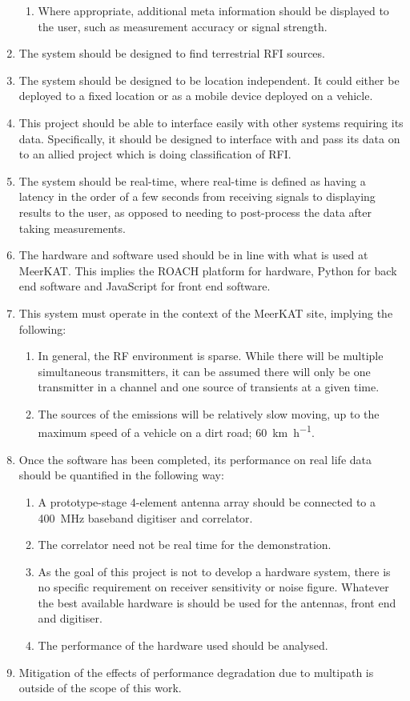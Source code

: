 \begin{enumerate}
\begin{enumerate}
      \item Where appropriate, additional meta information should be displayed to the user, such as measurement accuracy or signal strength.
    \end{enumerate}
  \item The system should be designed to find terrestrial RFI sources.
  \item The system should be designed to be location independent. It could either be deployed to a fixed location or as a mobile device deployed on a vehicle.
  \item This project should be able to interface easily with other systems requiring its data. Specifically, it should be designed to interface with and pass its data on to an allied project which is doing classification of RFI.
  \item The system should be real-time, where real-time is defined as having a latency in the order of a few seconds from receiving signals to displaying results to the user, as opposed to needing to post-process the data after taking measurements.
  \item The hardware and software used should be in line with what is used at MeerKAT. This implies the ROACH platform for hardware, Python for back end software and JavaScript for front end software.  
  \item This system must operate in the context of the MeerKAT site, implying the following:
  \begin{enumerate}
      \item In general, the RF environment is sparse. While there will be multiple simultaneous transmitters, it can be assumed there will only be one transmitter in a channel and one source of transients at a given time.
      \item The sources of the emissions will be relatively slow moving, up to the maximum speed of a vehicle on a dirt road; \SI[per-mode=symbol]{60}{\kilo\metre\per\hour}.
  \end{enumerate}

  \item Once the software has been completed, its performance on real life data should be quantified in the following way:
    \begin{enumerate}
      \item A prototype-stage 4-element antenna array should be connected to a \SI{400}{\mega\hertz} baseband digitiser and correlator.
      \item The correlator need not be real time for the demonstration.
      \item As the goal of this project is not to develop a hardware system, there is no specific requirement on receiver sensitivity or noise figure. Whatever the best available hardware is should be used for the antennas, front end and digitiser. 
      \item The performance of the hardware used should be analysed. 
    \end{enumerate}
  \item Mitigation of the effects of performance degradation due to multipath is outside of the scope of this work.


\end{enumerate}
